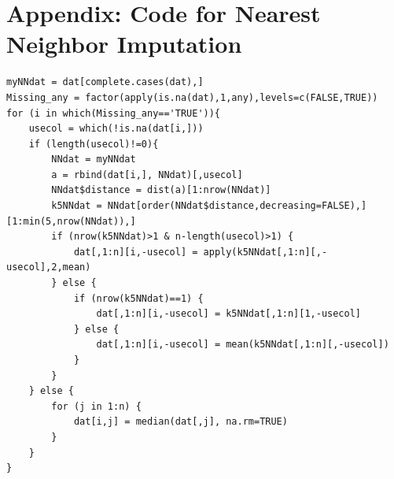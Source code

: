 \documentclass[english]{article}
\begin{document}





\section*{Appendix: Code for Nearest Neighbor Imputation}

\begin{verbatim}
myNNdat = dat[complete.cases(dat),]
Missing_any = factor(apply(is.na(dat),1,any),levels=c(FALSE,TRUE))
for (i in which(Missing_any=='TRUE')){
    usecol = which(!is.na(dat[i,]))
    if (length(usecol)!=0){
        NNdat = myNNdat
        a = rbind(dat[i,], NNdat)[,usecol]
        NNdat$distance = dist(a)[1:nrow(NNdat)]
        k5NNdat = NNdat[order(NNdat$distance,decreasing=FALSE),][1:min(5,nrow(NNdat)),]
        if (nrow(k5NNdat)>1 & n-length(usecol)>1) {
            dat[,1:n][i,-usecol] = apply(k5NNdat[,1:n][,-usecol],2,mean)
        } else {
            if (nrow(k5NNdat)==1) {
                dat[,1:n][i,-usecol] = k5NNdat[,1:n][1,-usecol]
            } else {
                dat[,1:n][i,-usecol] = mean(k5NNdat[,1:n][,-usecol])
            }
        }
    } else {
        for (j in 1:n) {
            dat[i,j] = median(dat[,j], na.rm=TRUE)
        }
    }
}
\end{verbatim}
\end{document}
